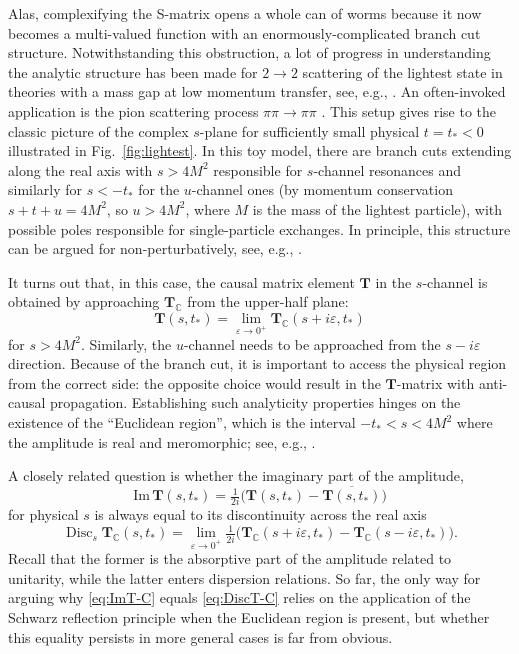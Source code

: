 \documentclass[12pt]{article}
\numberwithin{figure}{section}
\DeclareMathOperator{\Disc}{Disc}
\def \be {\begin{equation}}
\def \ee {\end{equation}}
\def \C {\mathbb{C}}
\def \eps {\varepsilon}
\def \Im {\mathrm{Im}}
\def \T {\mathbf{T}}
\begin{document}
    Alas, complexifying the S-matrix opens a whole can of worms because it now becomes a multi-valued function with an enormously-complicated branch cut structure. Notwithstanding this obstruction, a lot of progress in understanding the analytic structure has been made for $2\to2$ scattering of the lightest state in theories with a mass gap at low momentum transfer, see, e.g., \cite{Eden:1966dnq,Sommer:1970mr}. An often-invoked application is the pion scattering process $\pi \pi \to \pi \pi$ \cite{Martin:1965jj,Roy:1971tc,Colangelo:2001df,Caprini:2003ta,Pelaez:2004vs,Paulos:2017fhb,Martin:2017ndt,Guerrieri:2018uew,Guerrieri:2020bto,Albert:2022oes}. This setup gives rise to the classic picture of the complex $s$-plane for sufficiently small physical $t = t_\ast < 0$ illustrated in Fig.~\ref{fig:lightest}. In this toy model, there are branch cuts extending along the real axis with $s > 4M^2$ responsible for $s$-channel resonances and similarly for $s < -t_\ast$ for the $u$-channel ones (by momentum conservation $s+t+u = 4M^2$, so $u > 4M^2$, where $M$ is the mass of the lightest particle), with possible poles responsible for single-particle exchanges. In principle, this structure can be argued for non-perturbatively, see, e.g., \cite{Bogolyubov:104088}.
    
    It turns out that, in this case, the causal matrix element $\T$ in the $s$-channel is obtained by approaching $\mathbf{T}_\C$ from the upper-half plane:
    \be\label{eq:S-C}
    \mathbf{T}(s,t_\ast) = \lim_{\eps \to 0^+} \mathbf{T}_\C(s + i\eps, t_\ast)
    \ee
    for $s>4M^2$. Similarly, the $u$-channel needs to be approached from the $s-i\eps$ direction. Because of the branch cut, it is important to access the physical region from the correct side: the opposite choice would result in the $\T$-matrix with anti-causal propagation. Establishing such analyticity properties hinges on the existence of the ``Euclidean region'', which is the interval $-t_\ast < s < 4M^2$ where the amplitude is real and meromorphic; see, e.g., \cite{Eden:1966dnq}.
    
    A closely related question is whether the imaginary part of the amplitude,
	\be\label{eq:ImT-C}
	\Im\, \T(s,t_\ast) = \tfrac{1}{2i}\Big(\T(s, t_\ast) - \overline{\T(s, t_\ast)}\Big)
	\ee
	for physical $s$ is always equal to its discontinuity across the real axis
	\be\label{eq:DiscT-C}
	\Disc_s \T_\C(s,t_\ast) = \lim_{\eps \to 0^+} \tfrac{1}{2i}\Big(\T_\C(s+i\eps, t_\ast) - \T_\C(s-i\eps, t_\ast)\Big).
	\ee
	Recall that the former is the absorptive part of the amplitude related to unitarity, while the latter enters dispersion relations. So far, the only way for arguing why \eqref{eq:ImT-C} equals \eqref{eq:DiscT-C} relies on the application of the Schwarz reflection principle when the Euclidean region is present, but whether this equality persists in more general cases is far from obvious.
    
\end{document}
